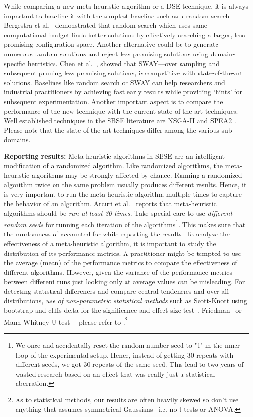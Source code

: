 \documentclass[sigconf,anonymous,review]{acmart}
\begin{document}
While comparing a new meta-heuristic algorithm or a DSE technique, it is always important to baseline it with the simplest baseline such as a random search. Bergestra et al.~\cite{bergstra2012random} demonstrated that random search which uses same computational budget finds better solutions by effectively searching a larger, less promising configuration space. Another alternative could be to generate numerous random solutions and reject less promising solutions using domain-specific heuristics. Chen et al.~\cite{chen2017sampling}, showed that SWAY---over sampling and subsequent pruning less promising solutions, is competitive with state-of-the-art solutions. Baselines like random search or SWAY can help researchers and industrial practitioners by achieving fast early results while providing `hints' for subsequent experimentation.
Another important aspect is to compare the performance of the new technique with the current state-of-the-art techniques. Well established techniques in the SBSE literature are NSGA-II and SPEA2~\cite{chen2017beyond}. Please note that the state-of-the-art techniques differ among the various sub-domains.

  \noindent\textbf{Reporting results: }
Meta-heuristic algorithms in SBSE are an intelligent modification of a randomized algorithm. Like randomized algorithms, the meta-heuristic algorithms may be strongly affected by chance. Running a randomized
algorithm twice on the same problem usually produces different results. Hence, it is very important to run the meta-heuristic algorithm multiple times to capture the behavior of an algorithm. Arcuri et al.~\cite{arcuri2011practical} reports that meta-heuristic algorithms should be \textit{run at least 30 times}. Take special care to use \textit{different random seeds} for running each iteration of the algorithms\footnote{We once and accidentally reset the random number seed to "1" in the inner loop of the experimental setup. Hence,  instead of getting 30 repeats with different seeds, we got 30 repeats of the same seed. This lead to two years of wasted research based
on an effect that was really just a statistical aberration.}. This makes sure that the randomness of accounted for while reporting the results. 
To analyze the effectiveness of a meta-heuristic algorithm, it is important to study the distribution of its performance metrics. A practitioner might be tempted to use the average (mean) of the performance metrics to compare the effectiveness of different algorithms. However, given the variance of the performance metrics between different runs just looking only at average values can be misleading. For detecting statistical differences and compare central tendencies and over all distributions, \textit{use of non-parametric statistical methods} such as Scott-Knott using bootstrap and cliffs delta for the significance and effect size test~\cite{mittas2013ranking, ghotra2015revisiting}, Friedman~\cite{lessmann2008benchmarking} or Mann-Whitney U-test~\cite{arcuri2011practical}-- please refer to \cite{arcuri2011practical, arcuri2014hitchhiker}.\footnote{
As to statistical methods, our results are often heavily skewed so don't use anything that assumes symmetrical Gaussians-- i.e.   no t-tests or ANOVA.}
\end{document}

